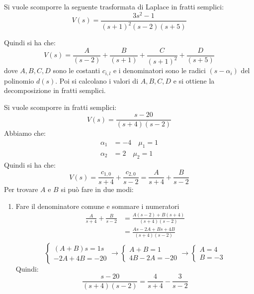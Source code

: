 \documentclass[a4paper]{article}
\begin{document}
\begin{example}
  Si vuole scomporre la seguente trasformata di Laplace in fratti semplici:
  \[
  V(s) = \frac{3s^2-1}{(s+1)^2(s-2)(s+5)}
  \] 

  \vspace{1em}
  \noindent
  Quindi si ha che:
  \[
    V(s) = \frac{A}{(s-2)} + \frac{B}{(s+1)} + \frac{C}{(s+1)^2} + \frac{D}{(s+5)}
  \] 
  dove \( A, B, C, D \) sono le costanti \( c_{i,l} \) e i denominatori sono le radici
  \( (s-\alpha_i) \) del polinomio \( d(s) \). Poi si calcolano i valori di \( A, B, C, D \)
  e si ottiene la decomposizione in fratti semplici.
\end{example}

\begin{example}
  Si vuole scomporre in fratti semplici:
  \[
  V(s) = \frac{s-20}{(s+4)(s-2)}
  \] 
  Abbiamo che:
  \[
  \begin{aligned}
    \alpha_1 &= -4 \quad \mu_1 = 1\\
    \alpha_2 &= 2 \quad \mu_2 = 1
  \end{aligned}
  \] 
  Quindi si ha che:
  \[
    V(s) = \frac{c_{1,0}}{s+4} + \frac{c_{2,0}}{s-2} = \frac{A}{s+4} + \frac{B}{s-2}
  \] 
  Per trovare \( A \) e \( B \) si può fare in due modi:
  \begin{enumerate}
    \item Fare il denominatore comune e sommare i numeratori
      \[
      \begin{aligned}
        \frac{A}{s+4} + \frac{B}{s-2} &= \frac{A(s-2)+B(s+4)}{(s+4)(s-2)}\\
                                      &= \frac{As-2A+Bs+4B}{(s+4)(s-2)}\\
      \end{aligned}
      \] 
      \[
      \begin{cases}
        (A+B)s = 1s\\
        -2A+4B = -20
      \end{cases}
      \to 
      \begin{cases}
        A+B = 1\\
        4B-2A = -20
      \end{cases}
      \to 
      \begin{cases}
        A = 4\\
        B = -3
      \end{cases}
      \] 
      Quindi:
      \[
        \frac{s-20}{(s+4)(s-2)} = \frac{4}{s+4} - \frac{3}{s-2}
      \] 


\end{enumerate}
\end{example}
\end{document}
